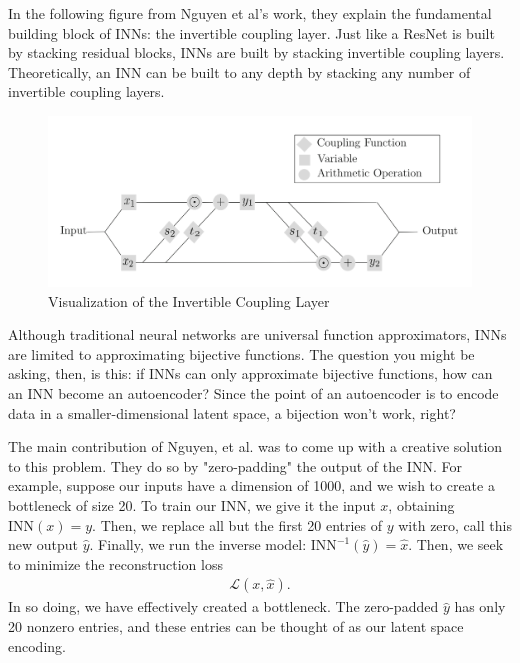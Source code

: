 \documentclass[11pt,letterpaper]{article}
\begin{document}
In the following figure from Nguyen et al's work, they explain the fundamental building block of INNs: the invertible coupling layer.
Just like a ResNet is built by stacking residual blocks, INNs are built by stacking invertible coupling layers.
Theoretically, an INN can be built to any depth by stacking any number of invertible coupling layers.

\begin{figure}[!htb]
\begin{center}
   \includegraphics[width=0.8\linewidth]{./pics/invertible_coupling_layer.png}
   \caption{Visualization of the Invertible Coupling Layer}
\end{center}
\end{figure}

Although traditional neural networks are universal function approximators, INNs are limited to approximating bijective functions.
The question you might be asking, then, is this: if INNs can only approximate bijective functions, how can an INN become an autoencoder?
Since the point of an autoencoder is to encode data in a smaller-dimensional latent space, a bijection won't work, right?

The main contribution of Nguyen, et al. was to come up with a creative solution to this problem.
They do so by "zero-padding" the output of the INN.
For example, suppose our inputs have a dimension of 1000, and we wish to create a bottleneck of size 20.
To train our INN, we give it the input $ x $, obtaining $ \text{INN}(x) = y $.
Then, we replace all but the first 20 entries of $ y $ with zero, call this new output $ \hat{y} $.
Finally, we run the inverse model: $\text{INN}^{-1}(\hat{y}) = \hat{x}$.
Then, we seek to minimize the reconstruction loss \begin{align*}
    \mathscr{L}(x, \hat{x}).
\end{align*}
In so doing, we have effectively created a bottleneck.
The zero-padded $ \hat{y} $ has only 20 nonzero entries, and these entries can be thought of as our latent space encoding.
\end{document}
